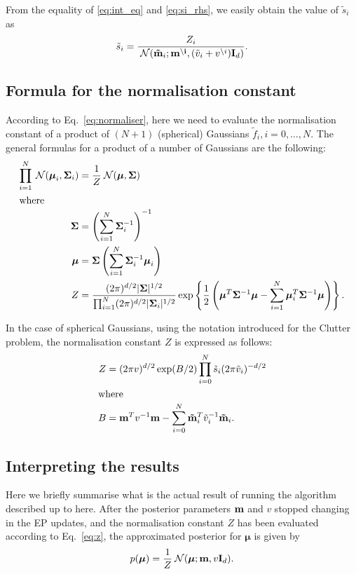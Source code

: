 \documentclass[11pt]{article}
\begin{document}
From the equality of \eqref{eq:int_eq} and \eqref{eq:si_rhs}, we easily 
obtain the value of $\tilde{s}_i$ as
\begin{equation}
	\tilde{s}_i = \frac{Z_i}{\:\mathcal{N}(\mathbf{\tilde{m}}_i;
							\mathbf{m^{\setminus i}}, (\tilde{v}_i + v^{\setminus 
							i})\mathbf{I}_d)}.
\end{equation}

\subsection*{Formula for the normalisation constant}
According to Eq.~\eqref{eq:normaliser}, here we need to evaluate the 
normalisation constant of a product of $(N + 1)$ (spherical) Gaussians 
$\tilde{f}_i, i=0,\dots,N$. The general formulas for a product of a number 
of Gaussians are the following:
\begin{align}
	\prod_{i=1}^{N} \:\mathcal{N}(\boldsymbol{\mu}_i, \mathbf{\Sigma}_i)
		&= \frac{1}{Z}\:\mathcal{N}(\boldsymbol{\mu}, \mathbf{\Sigma}) \\
\intertext{where}
	\boldsymbol{\Sigma} &=
		\left(\sum_{i=1}^{N}\mathbf{\Sigma}_i^{-1}\right)^{-1} \\
	\boldsymbol{\mu} &= \mathbf{\Sigma}\left(
		\sum_{i=1}^N\mathbf{\Sigma}_i^{-1}\boldsymbol{\mu}_i\right) \\
	Z &= \frac{(2\pi)^{d/2}|\mathbf{\Sigma}|^{1/2}}
						{\prod_{i=1}^N(2\pi)^{d/2}|\mathbf{\Sigma}_i|^{1/2}}
			 \exp\left\{\frac{1}{2}\left(
			 		\boldsymbol{\mu}^T\mathbf{\Sigma}^{-1}\boldsymbol{\mu}
					- \sum_{i=1}^N\boldsymbol{\mu}_i^T
												\mathbf{\Sigma}^{-1}\boldsymbol{\mu}
						\right)\right\}.
\end{align}

In the case of spherical Gaussians, using the notation introduced for the 
Clutter problem, the normalisation constant $Z$ is expressed as follows:
\begin{align}
	Z &= (2\pi v)^{d/2}\exp(B/2)\prod_{i=0}^N
					\tilde{s}_i(2\pi\tilde{v}_i)^{-d/2}
	\label{eq:z}
					\\
\intertext{where}
	B &= \mathbf{m}^Tv^{-1}\mathbf{m}
			 - \sum_{i=0}^N\mathbf{\tilde{m}}_i^T\tilde{v}_i^{-1}\mathbf{\tilde{m}}_i.
	\label{eq:b}
\end{align}

\subsection*{Interpreting the results}
Here we briefly summarise what is the actual result of running the 
algorithm described up to here.  After the posterior parameters 
$\mathbf{m}$ and $v$ stopped changing in the EP updates, and the 
normalisation constant $Z$ has been evaluated according to 
Eq.~\eqref{eq:z}, the approximated posterior for $\boldsymbol{\mu}$ is 
given by
\begin{equation}
	p(\boldsymbol{\mu}) = \frac{1}{Z}\:\mathcal{N}(\boldsymbol{\mu}; \mathbf{m}, 
v\mathbf{I}_d).
\end{equation}
\end{document}
